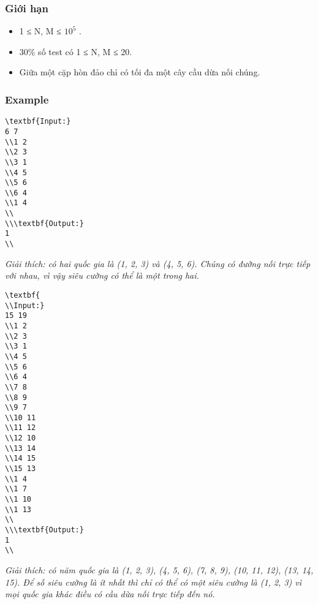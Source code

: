 \subsubsection{   Giới hạn  }
\begin{itemize}
	\item     1 ≤ N, M ≤ $10^{5}$    .   
	\item     30\% số test có 1 ≤ N, M ≤ 20.   
	\item     Giữa một cặp hòn đảo chỉ có tối đa một cây cầu dừa nối chúng.   
\end{itemize}

\subsubsection{   Example  }
\begin{verbatim}
\textbf{Input:}
6 7
\\1 2
\\2 3
\\3 1
\\4 5
\\5 6
\\6 4
\\1 4
\\
\\\textbf{Output:}
1
\\\end{verbatim}

\emph{    Giải thích: có hai quốc gia là (1, 2, 3) và (4, 5, 6). Chúng có đường nối trực tiếp với nhau, vì vậy siêu cường có thể là một trong hai.   }
\begin{verbatim}
\textbf{
\\Input:}
15 19
\\1 2
\\2 3
\\3 1
\\4 5
\\5 6
\\6 4
\\7 8
\\8 9
\\9 7
\\10 11
\\11 12
\\12 10
\\13 14
\\14 15
\\15 13
\\1 4
\\1 7
\\1 10
\\1 13
\\
\\\textbf{Output:}
1
\\\end{verbatim}

\emph{    Giải thích: có năm quốc gia là (1, 2, 3), (4, 5, 6), (7, 8, 9), (10, 11, 12), (13, 14, 15). Để số siêu cường là ít nhất thì chỉ có thể có một siêu cường là (1, 2, 3) vì mọi quốc gia khác điều có cầu dừa nối trực tiếp đến nó.   }
